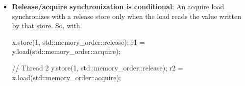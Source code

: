 \documentclass{report}
\begin{document}
\begin{itemize}
\begin{cppcode}
            // Thread 2
            y.store(1, std::memory_order::seq_cst);
            r2 = x.load(std::memory_order::seq_cst);
            \end{cppcode}
            \bigbreak \noindent 
            With exclusively sequentially consistent operations, this result is forbidden:
            \bigbreak \noindent 
            \begin{cppcode}
            r1 == 0 && r2 == 0
            \end{cppcode}
            \bigbreak \noindent 
            To obtain both zeros, each load would need to appear before the other thread’s store, producing an impossible cycle in the global sequentially consistent order.
        \item \textbf{Release/acquire synchronization is conditional}: An acquire load synchronizes with a release store only when the load reads the value written by that store.
            \bigbreak \noindent 
            So, with
            \bigbreak \noindent 
            \begin{cppcode}
                x.store(1, std::memory_order::release);
                r1 = y.load(std::memory_order::acquire);

                // Thread 2
                y.store(1, std::memory_order::release);
                r2 = x.load(std::memory_order::acquire);


\end{cppcode}
\end{itemize}
\end{document}
